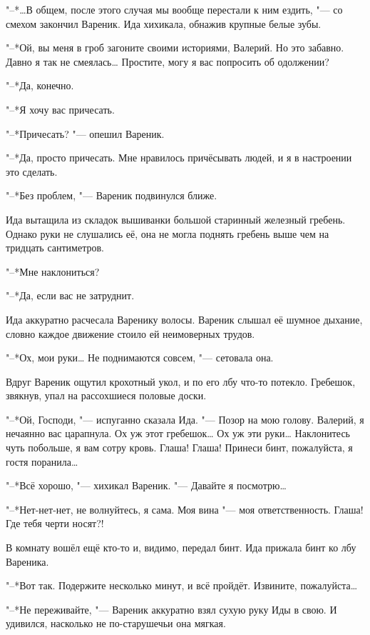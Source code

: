 \asterism

"--*\ldots{}В общем, после этого случая мы вообще перестали к ним ездить, "--- со смехом закончил Вареник.
Ида хихикала, обнажив крупные белые зубы.

"--*Ой, вы меня в гроб загоните своими историями, Валерий.
Но это забавно.
Давно я так не смеялась\ldots{}
Простите, могу я вас попросить об одолжении?

"--*Да, конечно.

"--*Я хочу вас причесать.

"--*Причесать? "--- опешил Вареник.

"--*Да, просто причесать.
Мне нравилось причёсывать людей, и я в настроении это сделать.

"--*Без проблем, "--- Вареник подвинулся ближе.

Ида вытащила из складок вышиванки большой старинный железный гребень.
Однако руки не слушались её, она не могла поднять гребень выше чем на тридцать сантиметров.

"--*Мне наклониться?

"--*Да, если вас не затруднит.

Ида аккуратно расчесала Варенику волосы.
Вареник слышал её шумное дыхание, словно каждое движение стоило ей неимоверных трудов.

"--*Ох, мои руки\ldots{}
Не поднимаются совсем, "--- сетовала она.

Вдруг Вареник ощутил крохотный укол, и по его лбу что-то потекло.
Гребешок, звякнув, упал на рассохшиеся половые доски.

"--*Ой, Господи, "--- испуганно сказала Ида.
"--- Позор на мою голову.
Валерий, я нечаянно вас царапнула.
Ох уж этот гребешок\ldots{}
Ох уж эти руки\ldots{}
Наклонитесь чуть побольше, я вам сотру кровь.
Глаша!
Глаша!
Принеси бинт, пожалуйста, я гостя поранила\ldots{}

"--*Всё хорошо, "--- хихикал Вареник.
"--- Давайте я посмотрю\ldots{}

"--*Нет-нет-нет, не волнуйтесь, я сама.
Моя вина "--- моя ответственность.
Глаша!
Где тебя черти носят?!

В комнату вошёл ещё кто-то и, видимо, передал бинт.
Ида прижала бинт ко лбу Вареника.

"--*Вот так.
Подержите несколько минут, и всё пройдёт.
Извините, пожалуйста\ldots{}

"--*Не переживайте, "--- Вареник аккуратно взял сухую руку Иды в свою.
И удивился, насколько не по-старушечьи она мягкая.

